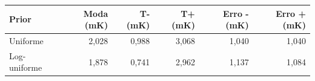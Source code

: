 \begin{tabular}{lrrrrr}
\toprule
Prior & Moda (mK) & T- (mK) & T+ (mK) & Erro - (mK) & Erro + (mK) \\
\midrule
Uniforme & 2,028 & 0,988 & 3,068 & 1,040 & 1,040 \\
Log-uniforme & 1,878 & 0,741 & 2,962 & 1,137 & 1,084 \\
\bottomrule
\end{tabular}
